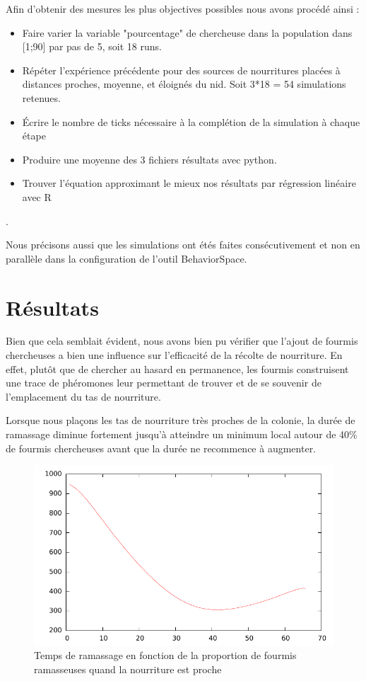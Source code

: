 \documentclass{article}
\begin{document}
Afin d'obtenir des mesures les plus objectives possibles nous avons procédé ainsi :
\begin{itemize}  
\item Faire varier la variable "pourcentage" de chercheuse dans la population dans [1;90] par pas de 5, soit 18 runs.
\item Répéter l'expérience précédente pour des sources de nourritures placées à distances  proches, moyenne, et éloignés du nid. Soit 3*18 = 54 simulations retenues.
\item Écrire le nombre de ticks nécessaire à la complétion de la simulation à chaque étape
\item Produire une moyenne des 3 fichiers résultats avec python.
\item Trouver l'équation approximant le mieux nos résultats par régression linéaire avec R
\end{itemize}.

Nous précisons aussi que les simulations ont étés faites consécutivement et non en parallèle dans la configuration de l'outil BehaviorSpace.
\section{Résultats}
Bien que cela semblait évident, nous avons bien pu vérifier que l'ajout de fourmis chercheuses a bien une influence sur l'efficacité de la récolte de nourriture. En effet, plutôt que de chercher au hasard en permanence, les fourmis construisent une trace de phéromones leur permettant de trouver et de se souvenir de l'emplacement du tas de nourriture.

Lorsque nous plaçons les tas de nourriture très proches de la colonie, la durée de ramassage diminue fortement jusqu'à atteindre un minimum local autour de 40\% de fourmis chercheuses avant que la durée ne recommence à augmenter.

\begin{figure}[H]
\centering
\includegraphics[scale=0.6]{contenu/near.pdf}
\caption{Temps de ramassage en fonction de la proportion de fourmis ramasseuses quand la nourriture est proche}
\label{fig:proche}
\end{figure}
\end{document}
